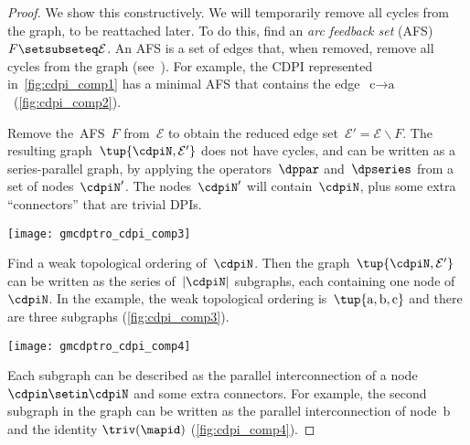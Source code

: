 \begin{proof}
    We show this constructively.
    We will temporarily remove all cycles from the graph, to be reattached later.
    To do this, find an \emph{arc feedback set} (AFS) $F\setsubseteq\mathcal{E}$.
    An AFS is a set of edges that, when removed, remove all cycles from the graph (see~\cite{golovach15incremental}).
    For example, the CDPI represented in~\cref{fig:cdpi_comp1} has a minimal AFS that contains the edge~$\text{c}\rightarrow\text{a}$~(\cref{fig:cdpi_comp2}).

    Remove the~AFS~$F$ from~$\mathcal{E}$ to obtain the reduced edge set~$\mathcal{E}'=\mathcal{E}\backslash F$.
    The resulting graph~$\tup{ \cdpiN,\mathcal{E}'} $ does not have cycles, and can be written as a series-parallel graph, by applying the operators~$\dppar$ and~$\dpseries$ from a set of nodes~$\cdpiN'$.
    The nodes~$\cdpiN'$ will contain~$\cdpiN$, plus some extra ``connectors'' that are trivial DPIs.
    \begin{marginfigure}
        \texttt{[image: gmcdptro\_cdpi\_comp3]}
        \caption{}
        \label{fig:cdpi_comp3}
    \end{marginfigure}
    Find a weak topological ordering of~$\cdpiN$.
    Then the graph~$\tup{ \cdpiN,\mathcal{E}'} $ can be written as the series of~$|\cdpiN|$ subgraphs, each containing one node of~$\cdpiN$.
    In the example, the weak topological ordering is~$\tup{ \text{a},\text{b},\text{c}} $ and there are three subgraphs (\cref{fig:cdpi_comp3}).

    \begin{marginfigure}
        \texttt{[image: gmcdptro\_cdpi\_comp4]}
        \caption{}
        \label{fig:cdpi_comp4}
    \end{marginfigure}

    Each subgraph can be described as the parallel interconnection of a node~$\cdpin\setin\cdpiN$ and some extra connectors.
    For example, the second subgraph in the graph can be written as the parallel interconnection of node~$\text{b}$ and the identity $\triv(\mapid)$ (\cref{fig:cdpi_comp4}).


\end{proof}
